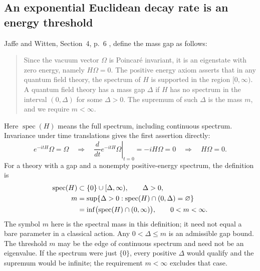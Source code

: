 \subsection{An exponential Euclidean decay rate is an energy threshold}
Jaffe and Witten, Section~4, p.~6 \cite{JaffeWitten2006}, define the mass gap as
follows:
\begin{quote}
Since the vacuum vector $\Omega$ is Poincar\'e invariant, it is an eigenstate
with zero energy, namely $H\Omega=0$. The positive energy axiom asserts
that in any quantum field theory, the spectrum of $H$ is supported in the
region $[0,\infty)$. A quantum field theory has a mass gap $\Delta$ if $H$
has no spectrum in the interval $(0,\Delta)$ for some $\Delta>0$. The
supremum of such $\Delta$ is the mass $m$, and we require $m<\infty$.
\end{quote}
Here $\operatorname{spec}(H)$ means the full spectrum, including continuous
spectrum. Invariance under time translations gives the first assertion
directly:
\begin{equation}\label{qft:vacuum-zero-energy}
 e^{-itH}\Omega=\Omega
 \quad\Longrightarrow\quad
 \left.\frac{d}{dt}e^{-itH}\Omega\right|_{t=0}
 =-iH\Omega=0
 \quad\Longrightarrow\quad H\Omega=0.
\end{equation}
For a theory with a gap and a nonempty positive-energy spectrum, the
definition is
\begin{align}
 \operatorname{spec}(H)&\subset\{0\}\cup[\Delta,\infty),
 \qquad\Delta>0,\notag\\
 m&=\sup\{\Delta>0:
       \operatorname{spec}(H)\cap(0,\Delta)=\varnothing\}\notag\\
  &=\inf\bigl(\operatorname{spec}(H)\cap(0,\infty)\bigr),
  \qquad 0<m<\infty.
 \label{qft:mass-gap-definition}
\end{align}
The symbol $m$ here is the spectral mass in this definition; it need not
equal a bare parameter in a classical action. Any $0<\Delta\le m$ is an
admissible gap bound. The threshold $m$ may be the edge of continuous
spectrum and need not be an eigenvalue. If the spectrum were just $\{0\}$,
every positive $\Delta$ would qualify and the supremum would be infinite;
the requirement $m<\infty$ excludes that case.

